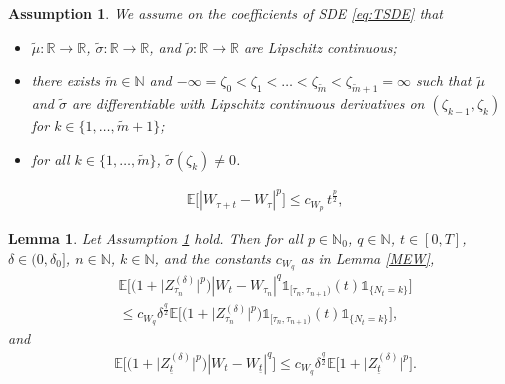 \documentclass[10pt,a4paper]{amsart}
\makeatletter
\newtheorem{assumption}{Assumption}
\newtheorem{lemma}{Lemma}
\newcommand{\E}{{\mathbb{E}}}
\newcommand{\N}{{\mathbb{N}}}
\newcommand{\R}{{\mathbb{R}}}
\def\namedlabel#1#2{\begingroup
    #2%
    \def\@currentlabel{#2}%
    \phantomsection\label{#1}\endgroup
}
\makeatother
\begin{document}
\begin{assumption}\label{assZ} 
We assume on the coefficients of SDE \eqref{eq:TSDE} that
\begin{itemize}
\item[\namedlabel{Zi}{(i)}] $\widetilde\mu\colon\R \to \R$,  $\widetilde\sigma\colon\R\to\R$, and $\widetilde\rho\colon\R\to\R$ are Lipschitz continuous;
\item[\namedlabel{Zii}{(ii)}] there exists $\widetilde m\in\N$ and $-\infty = \zeta_0 < \zeta_1 < \ldots< \zeta_{\widetilde m}< \zeta_{\widetilde m+1} =\infty$ such that $\widetilde\mu$ and $\widetilde \sigma$ are differentiable with Lipschitz continuous derivatives on $(\zeta_{k-1},\zeta_{k})$ for $k\in\{1,\ldots,\widetilde m+1\}$;
\item[\namedlabel{Zv}{(iii)}] for all $k\in\{1,\dots,\widetilde m\}$, $\widetilde\sigma(\zeta_k) \neq 0$.
\end{itemize}
\end{assumption}

\begin{equation}\label{MEW}
\begin{aligned}
&\E\big[|W_{\tau+t} - W_\tau|^p\big] \leq c_{W_p} \, t^\frac{p}{2},
\end{aligned}
\end{equation}

\begin{lemma}\label{MW}
    Let Assumption \ref{assZ} hold. Then for all $p\in\N_0$, $q\in\N$, $t\in[0,T]$, $\delta \in(0,\delta_0]$, $n\in\N$, $k\in\N$, and the constants $c_{W_q}$ as in Lemma \ref{MEW},
    \begin{equation}\label{MWeq1}
        \begin{aligned}
        &\E\Big[\big(1+ \big|Z^{(\delta)}_{\tau_n}\big|^p\big)   |W_t-W_{\tau_n}|^q \mathds{1}_{[\tau_n,\tau_{n+1})}(t)  \mathds{1}_{\{N_t = k\}} \Big]\\
        &\leq c_{W_q} \delta^{\frac{q}{2}} \E\Big[ \big(1+ \big|Z^{(\delta)}_{\tau_n}\big|^p\big) \mathds{1}_{[\tau_n,\tau_{n+1})}(t)  \mathds{1}_{\{N_t = k\}} \Big],
        \end{aligned}
    \end{equation}
    and
    \begin{equation}\label{MWeq2}
        \begin{aligned}
        &\E\Big[ \big(1+ \big|Z^{(\delta)}_{\underline{t}}\big|^p\big)   |W_t-W_{\underline{t}}|^q \Big]
        \leq c_{W_q} \delta^{\frac{q}{2}} \E\Big[ 1+ \big|Z^{(\delta)}_{\underline{t}}\big|^p \Big].
        \end{aligned}
    \end{equation}
\end{lemma}
\end{document}
